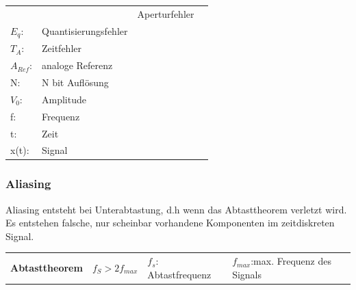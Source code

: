\begin{longtable}[c]{ l  l l l }
&
\begin{minipage}{5cm}
\begin{tabular}{ll}
$E_{A}$: &Aperturfehler\\
$E_{q}$:&Quantisierungsfehler\\
$T_{A}$:&Zeitfehler\\
$A_{Ref}$:&analoge Referenz\\
N:& N bit Auflösung\\
$V_0$: &Amplitude\\
f: &Frequenz\\
t: &Zeit\\
x(t):&Signal
\end{tabular}


\end{minipage}
\\
\end{longtable}


\subsubsection{Aliasing}
Aliasing entsteht bei Unterabtastung, d.h wenn das Abtasttheorem verletzt wird.
Es entstehen falsche, nur scheinbar vorhandene Komponenten im zeitdiskreten
Signal.

\begin{tabular}{llll}
	\textbf{Abtasttheorem}
	& $f_{S}>2f_{max}$
	& $f_{s}$: Abtastfrequenz
	&$f_{max}$:max. Frequenz des Signals
\end{tabular}

%
